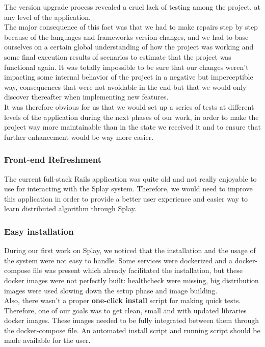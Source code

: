 \documentclass{eplmastersthesis}
\begin{document}
          The version upgrade process revealed a cruel lack of testing among
          the project, at any level of the application.\\
          The major consequence of this fact was that we had to make repairs
          step by step because of the languages and frameworks version changes,
          and we had to base ourselves on a certain global understanding of how
          the project was working and some final execution results of scenarios
          to estimate that the project was functional again. It was totally
          impossible to be sure that our changes weren't impacting some internal
          behavior of the project in a negative but imperceptible way,
          consequences that were not avoidable in the end but that we would
          only discover thereafter when implementing new features.\\
          It was therefore obvious for us that we would set up a series of tests
          at different levels of the application during the next phases of our
          work, in order to make the project way more maintainable than in the
          state we received it and to ensure that further enhancement would
          be way more easier.

        \subsubsection{Front-end Refreshment}

          The current full-stack Rails application was quite old and not
          really enjoyable to use for interacting with the Splay system.
          Therefore, we would need to improve this application in order to
          provide a better user experience and easier way to learn distributed
          algorithm through Splay.

        \subsubsection{Easy installation}

          During our first work on Splay, we noticed that the installation and the
          usage of the system were not easy to handle. Some services were dockerized
          and a docker-compose file was present which already facilitated the
          installation, but these docker images were not perfectly built:
          healthcheck were missing, big distribution images were used slowing down
          the setup phase and image building.\\
          Also, there wasn't a proper \textbf{one-click install} script for
          making quick tests.\\
          Therefore, one of our goals was to get clean, small and with updated
          libraries docker images. These images needed to be fully integrated
          between them through the docker-compose file. An automated install
          script and running script should be made available for the user.
\end{document}
